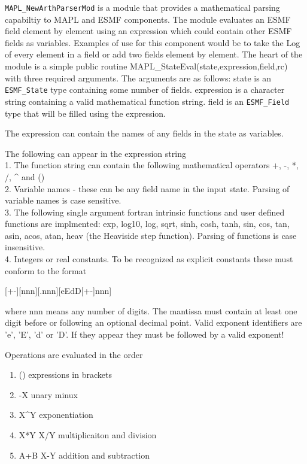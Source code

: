{\tt MAPL\_NewArthParserMod} is a module that provides a mathematical
parsing capabiltiy to MAPL and ESMF components. The module evaluates an ESMF field element by element
using an expression which could contain other ESMF fields as variables.
Examples of use for this component would be to take the Log of every element in a field
or add two fields element by element.
The heart of the module is
a simple public routine MAPL\_StateEval(state,expression,field,rc) with three required arguments.
The arguments are as follows: \newline
state is an \texttt{ESMF\_State} type containing some number of fields.\newline
expression is a character string containing a valid mathematical function string.\newline
field is an \texttt{ESMF\_Field} type that will be filled using the expression.\newline

The expression can contain the names of any fields in the state as variables.

The following can appear in the expression string\\
1. The function string can contain the following mathematical operators +, -, *, /, \^{} and ()\\
2. Variable names - these can be any field name in the input state. Parsing of variable names is case sensitive.\\
3. The following single argument fortran intrinsic functions and user defined functions are implmented:
exp, log10, log, sqrt, sinh, cosh, tanh, sin, cos, tan, asin,
acos, atan, heav (the Heaviside step function).
Parsing of functions is case insensitive.\\
4. Integers or real constants.
To be recognized
as explicit constants these must conform to the format

[+\textbar-][nnn][.nnn][e\textbar E\textbar d\textbar D[+\textbar-]nnn]

where nnn means any number of digits. The mantissa must contain at least
one digit before or following an optional decimal point. Valid exponent
identifiers are 'e', 'E', 'd' or 'D'. If they appear they must be followed
by a valid exponent!

Operations are evaluated in the order
\begin{enumerate}
\item ()      expressions in brackets
\item -X      unary minux
\item X\^{}Y  exponentiation
\item X*Y X/Y multiplicaiton and division
\item A+B X-Y addition and subtraction
\end{enumerate}

